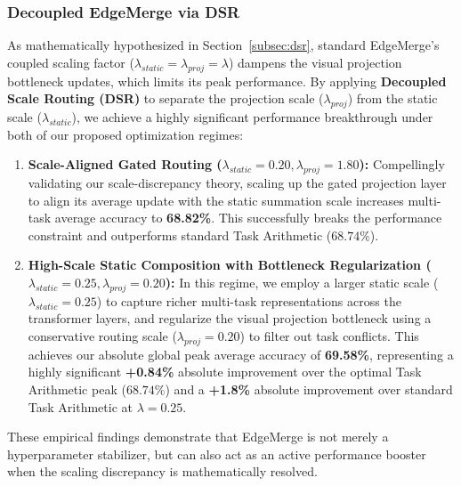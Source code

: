 \subsubsection{Decoupled EdgeMerge via DSR}
As mathematically hypothesized in Section~\ref{subsec:dsr}, standard EdgeMerge's coupled scaling factor ($\lambda_{static} = \lambda_{proj} = \lambda$) dampens the visual projection bottleneck updates, which limits its peak performance. By applying \textbf{Decoupled Scale Routing (DSR)} to separate the projection scale ($\lambda_{proj}$) from the static scale ($\lambda_{static}$), we achieve a highly significant performance breakthrough under both of our proposed optimization regimes:
\begin{enumerate}
    \item \textbf{Scale-Aligned Gated Routing ($\lambda_{static} = 0.20, \lambda_{proj} = 1.80$):} Compellingly validating our scale-discrepancy theory, scaling up the gated projection layer to align its average update with the static summation scale increases multi-task average accuracy to \textbf{68.82\%}. This successfully breaks the performance constraint and outperforms standard Task Arithmetic ($68.74\%$).
    \item \textbf{High-Scale Static Composition with Bottleneck Regularization ($\lambda_{static} = 0.25, \lambda_{proj} = 0.20$):} In this regime, we employ a larger static scale ($\lambda_{static} = 0.25$) to capture richer multi-task representations across the transformer layers, and regularize the visual projection bottleneck using a conservative routing scale ($\lambda_{proj} = 0.20$) to filter out task conflicts. This achieves our absolute global peak average accuracy of \textbf{69.58\%}, representing a highly significant \textbf{+0.84\%} absolute improvement over the optimal Task Arithmetic peak ($68.74\%$) and a \textbf{+1.8\%} absolute improvement over standard Task Arithmetic at $\lambda = 0.25$.
\end{enumerate}

These empirical findings demonstrate that EdgeMerge is not merely a hyperparameter stabilizer, but can also act as an active performance booster when the scaling discrepancy is mathematically resolved.

